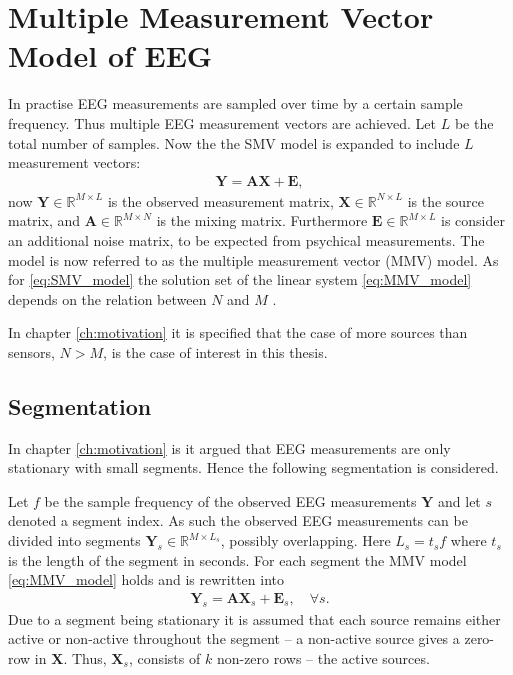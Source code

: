 \section{Multiple Measurement Vector Model of EEG}\label{sec:MMV}
In practise EEG measurements are sampled over time by a certain sample frequency. 
Thus multiple EEG measurement vectors are achieved.
Let $L$ be the total number of samples. Now the  
the SMV model is expanded to include $L$ measurement vectors:
\begin{align}\label{eq:MMV_model}
\mathbf{Y} = \mathbf{AX}+\textbf{E},
\end{align}
now $\mathbf{Y} \in \mathbb{R}^{M \times L}$ is the observed measurement matrix, $\mathbf{X} \in \mathbb{R}^{N \times L}$ is the source matrix, and $\mathbf{A} \in \mathbb{R}^{M \times N}$ is the mixing matrix. 
Furthermore $\textbf{E} \in \mathbb{R}^{M \times L}$ is consider an additional noise matrix, to be expected from psychical measurements.  
The model is now referred to as the multiple measurement vector (MMV) model.
As for \eqref{eq:SMV_model} the solution set of the linear system \eqref{eq:MMV_model} depends on the relation between $N$ and $M$ \cite[p. 42]{CS}. 

In chapter \ref{ch:motivation} it is specified that the case of more sources than sensors, $N>M$, is the case of interest in this thesis.  

\subsection{Segmentation}
In chapter \ref{ch:motivation} is it argued that EEG measurements are only stationary with small segments. 
Hence the following segmentation is considered.   

Let $f$ be the sample frequency of the observed EEG measurements $\mathbf{Y}$ and let $s$ denoted a segment index.
As such the observed EEG measurements can be divided into segments  $\mathbf{Y}_s \in \mathbb{R}^{M \times L_s}$, possibly overlapping. Here $L_s = t_{s}f$ where $t_s$ is the length of the segment in seconds. For each segment the MMV model \eqref{eq:MMV_model} holds and is rewritten into
\begin{align}\label{eq:MMV_seg}
\mathbf{Y}_s = \mathbf{AX}_s + \textbf{E}_s, \quad \forall s.
\end{align}
Due to a segment being stationary it is assumed that each source remains either active or non-active throughout the segment -- a non-active source gives a zero-row in $\textbf{X}$.
Thus, $\mathbf{X}_s$, consists of $k$ non-zero rows -- the active sources.


